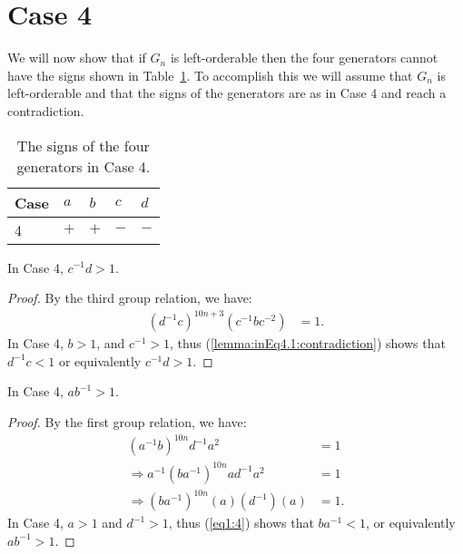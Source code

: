 
\section{Case 4}
\label{section:case4}

\noindent{}We will now show that if $G_n$ is left-orderable then the four generators cannot have the signs shown in Table~\ref{table:case4}. To accomplish this we will assume that $G_n$ is left-orderable and that the signs of the generators are as in Case 4 and reach a contradiction.

\begin{table}[ht]
\begin{center}
\begin{tabular}{l | l | l | l | l}
Case\hspace{10 pt} & $a$\hspace{10 pt} & $b$\hspace{10 pt} & $c$\hspace{10 pt} & $d$\hspace{10 pt} \\\hline\hline
4 & $+$ & $+$ & $-$ & $-$ 
\end{tabular}
\end{center}
\caption{The signs of the four generators in Case 4.}
\label{table:case4}
\end{table}

\begin{lemma} In Case 4, $c^{-1}d>1$.
\label{inEq4.1}
\end{lemma}
\begin{proof} By the third group relation, we have:
\begin{align}
(d^{-1}c)^{10n+3}(c^{-1}bc^{-2})&=1.\label{lemma:inEq4.1:contradiction}
\end{align}
In Case 4, $b>1$, and $c^{-1}>1$, thus (\ref{lemma:inEq4.1:contradiction}) shows that $d^{-1}c<1$ or equivalently $c^{-1}d>1$.
\end{proof}

\begin{lemma} In Case 4, $ab^{-1}>1$.
\label{inEq4.2}
\end{lemma}
\begin{proof} By the first group relation, we have:
\begin{align}
(a^{-1}b)^{10n}d^{-1}a^2&=1\nonumber{}\\
\Rightarrow a^{-1}(ba^{-1})^{10n}ad^{-1}a^{2}&=1\nonumber{}\\
\Rightarrow(ba^{-1})^{10n}(a)(d^{-1})(a)&=1.\label{eq1:4}
\end{align}
In Case 4, $a>1$ and $d^{-1}>1$, thus (\ref{eq1:4}) shows that $ba^{-1}<1$, or equivalently $ab^{-1}>1$.
\end{proof}

